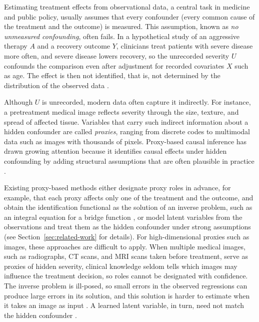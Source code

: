 Estimating treatment effects from observational data, a central task in medicine and public policy, usually assumes that every confounder (every common cause of the treatment and the outcome) is measured. This assumption, known as \emph{no unmeasured confounding}, often fails. In a hypothetical study of an aggressive therapy $A$ and a recovery outcome $Y$, clinicians treat patients with severe disease more often, and severe disease lowers recovery, so the unrecorded severity $U$ confounds the comparison even after adjustment for recorded covariates $X$ such as age. The effect is then not identified, that is, not determined by the distribution of the observed data \citep{pearl2009causality}.

Although $U$ is unrecorded, modern data often capture it indirectly. For instance, a pretreatment medical image reflects severity through the size, texture, and spread of affected tissue. Variables that carry such indirect information about a hidden confounder are called \emph{proxies}, ranging from discrete codes to multimodal data such as images with thousands of pixels. Proxy-based causal inference has drawn growing attention because it identifies causal effects under hidden confounding by adding structural assumptions that are often plausible in practice \citep{kuroki2014measurement,miao2018proxy,tchetgen2024ProximalCausalInference}.

Existing proxy-based methods either designate proxy roles in advance, for example, that each proxy affects only one of the treatment and the outcome, and obtain the identification functional as the solution of an inverse problem, such as an integral equation for a bridge function \citep{miao2018proxy}, or model latent variables from the observations and treat them as the hidden confounder under strong assumptions \citep{louizos2017causal} (see Section~\ref{sec:related-work} for details). For high-dimensional proxies such as images, these approaches are difficult to apply. When multiple medical images, such as radiographs, CT scans, and MRI scans taken before treatment, serve as proxies of hidden severity, clinical knowledge seldom tells which images may influence the treatment decision, so roles cannot be designated with confidence. The inverse problem is ill-posed, so small errors in the observed regressions can produce large errors in its solution, and this solution is harder to estimate when it takes an image as input \citep{kallus2021causal}. A learned latent variable, in turn, need not match the hidden confounder \citep{rissanen2021critical}.

